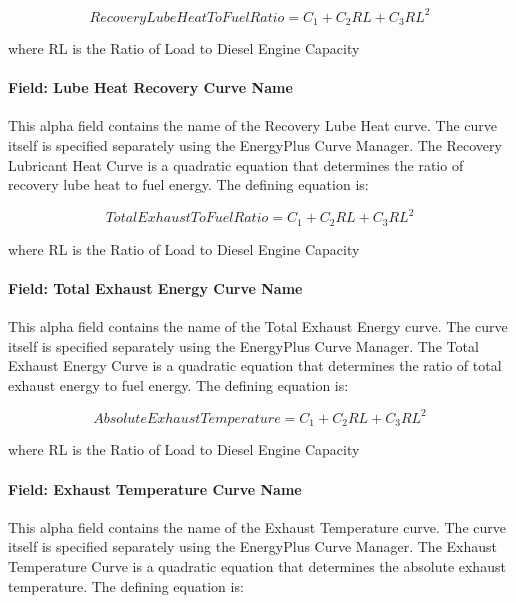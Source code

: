 \begin{equation}
    RecoveryLubeHeatToFuelRatio = {C_1} + {C_2}RL + {C_3}R{L^2}
\end{equation}

where RL is the Ratio of Load to Diesel Engine Capacity

\paragraph{Field: Lube Heat Recovery Curve Name}\label{field-lube-heat-recovery-curve-name-000}

This alpha field contains the name of the Recovery Lube Heat curve. The curve itself is specified separately using the EnergyPlus Curve Manager. The Recovery Lubricant Heat Curve is a quadratic equation that determines the ratio of recovery lube heat to fuel energy. The defining equation is:

\begin{equation}
    TotalExhaustToFuelRatio = {C_1} + {C_2}RL + {C_3}R{L^2}
\end{equation}

where RL is the Ratio of Load to Diesel Engine Capacity

\paragraph{Field: Total Exhaust Energy Curve Name}\label{field-total-exhaust-energy-curve-name-000}

This alpha field contains the name of the Total Exhaust Energy curve. The curve itself is specified separately using the EnergyPlus Curve Manager. The Total Exhaust Energy Curve is a quadratic equation that determines the ratio of total exhaust energy to fuel energy. The defining equation is:

\begin{equation}
    AbsoluteExhaustTemperature = {C_1} + {C_2}RL + {C_3}R{L^2}
\end{equation}

where RL is the Ratio of Load to Diesel Engine Capacity

\paragraph{Field: Exhaust Temperature Curve Name}\label{field-exhaust-temperature-curve-name-000}

This alpha field contains the name of the Exhaust Temperature curve. The curve itself is specified separately using the EnergyPlus Curve Manager. The Exhaust Temperature Curve is a quadratic equation that determines the absolute exhaust temperature. The defining equation is:

